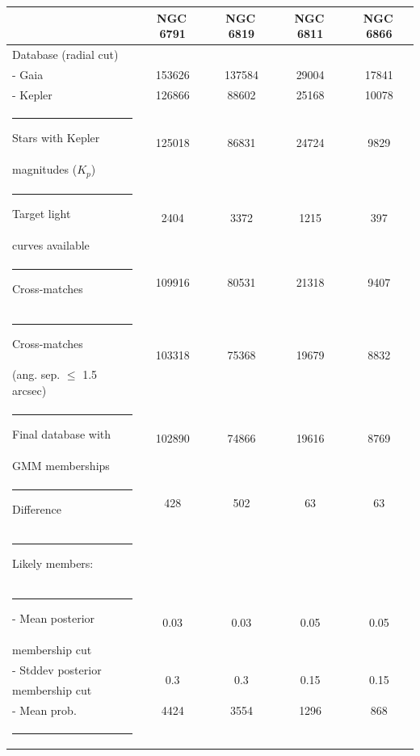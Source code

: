 \begin{table}[p]
    \centering
    \setlength\tabcolsep{11pt}
    \begin{tabular}{lcccc}
        \toprule
         & NGC\,6791 & NGC\,6819 & NGC\,6811 & NGC\,6866 \\
        \midrule
        \midrule
        Database (radial cut) &  &  &  & \\
         - Gaia  & 153626 & 137584 & 29004 & 17841 \\
         - Kepler& 126866 & 88602 & 25168 & 10078 \\\rule{-3pt}{1.2em}
        Stars with Kepler & \multirow{2}{*}{125018} & \multirow{2}{*}{86831} & \multirow{2}{*}{24724} & \multirow{2}{*}{9829} \\
        magnitudes ($K_p$) &  &  &  & \\\rule{-3pt}{1.2em}
        Target light & \multirow{2}{*}{2404} & \multirow{2}{*}{3372} & \multirow{2}{*}{1215} & \multirow{2}{*}{397} \\
        curves available &  &  &  & \\\rule{-3pt}{1.2em}
        Cross-matches & 109916 & 80531 & 21318 & 9407 \\\rule{-3pt}{1.2em}
        Cross-matches & \multirow{2}{*}{103318} & \multirow{2}{*}{75368} & \multirow{2}{*}{19679} & \multirow{2}{*}{8832} \\
        (ang. sep. $\leq$ 1.5\,arcsec) &  &  &  & \\\rule{-3pt}{1.2em}
        Final database with & \multirow{2}{*}{102890} & \multirow{2}{*}{74866} & \multirow{2}{*}{19616} & \multirow{2}{*}{8769} \\
        GMM memberships &  &  &  & \\\midrule
        \rule{-3pt}{1.2em}
        Difference & 428 & 502 & 63 & 63 \\\midrule
        \rule{-3pt}{2em}
        Likely members: &  &  &  & \\\rule{-3pt}{1.2em}
         - Mean posterior & \multirow{2}{*}{0.03} & \multirow{2}{*}{0.03} & \multirow{2}{*}{0.05} & \multirow{2}{*}{0.05} \\
           membership cut &  &  &  & \\\rule{0pt}{1em}
         - Stddev posterior & \multirow{2}{*}{0.3} & \multirow{2}{*}{0.3} & \multirow{2}{*}{0.15} & \multirow{2}{*}{0.15} \\
           membership cut &  &  &  & \\\rule{0pt}{1em}
         - Mean prob. & 4424 & 3554 & 1296 & 868 \\\rule{-3pt}{1.2em}

\end{tabular}
\end{table}
